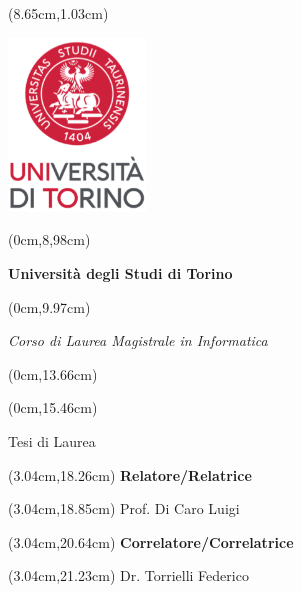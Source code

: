 \documentclass[
  a4paper, twoside, 10pt, titlepage]{book}
\author{}
\date{}
\begin{document}
\frontmatter

\frontmatter

\thispagestyle{empty}

\begingroup


\begin{textblock*}{4cm}(8.65cm,1.03cm)
	\centerline {\includegraphics[width=3.67cm]{src/res/unito_logo.png}}
\end{textblock*}


\begin{textblock*}{21cm}(0cm,8,98cm)
	\fontsize{18}{22}\selectfont
	\centerline {\textbf{ Universit\`a degli Studi di Torino}}
\end{textblock*}
\begin{textblock*}{21cm}(0cm,9.97cm)
	\fontsize{18}{22}\selectfont
	\centerline {\textit{Corso di Laurea Magistrale in Informatica}}
\end{textblock*}


\begin{textblock*}{21cm}(0cm,13.66cm)
	\fontsize{20}{24}\selectfont
  \centerline  {\textbf{}}
\end{textblock*}
\begin{textblock*}{21cm}(0cm,15.46cm)
	\fontsize{18}{22}\selectfont
	\centerline{\Large {Tesi di Laurea}}
\end{textblock*}



\fontsize{14}{17}\selectfont

\begin{textblock*}{8cm}(3.04cm,18.26cm)
	\noindent
	\textbf{Relatore/Relatrice}
\end{textblock*}
\begin{textblock*}{8cm}(3.04cm,18.85cm)
	\noindent
	Prof. Di Caro Luigi
\end{textblock*}

\begin{textblock*}{8cm}(3.04cm,20.64cm)
	\noindent
	\textbf{Correlatore/Correlatrice}
\end{textblock*}
\begin{textblock*}{8cm}(3.04cm,21.23cm)
	\noindent
	Dr. Torrielli Federico
\end{textblock*}
\end{document}
